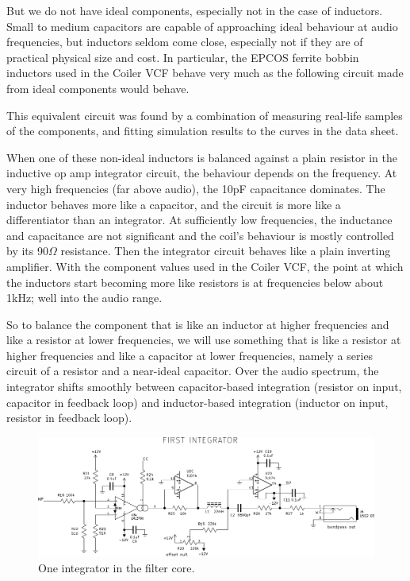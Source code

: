 But we do not have ideal components, especially not in the case of
inductors.  Small to medium capacitors are capable of approaching ideal
behaviour at audio frequencies, but inductors seldom come close, especially
not if they are of practical physical size and cost.  In particular, the
EPCOS ferrite bobbin inductors used in the Coiler VCF behave very much as
the following circuit made from ideal components would behave.

\vspace{0.5\baselineskip}
{\centering\par}

This equivalent circuit was found by a combination of measuring
real-life samples of the components, and fitting simulation results to the
curves in the data sheet.

When one of these non-ideal inductors is balanced against a plain resistor
in the inductive op amp integrator circuit, the behaviour depends on the
frequency.  At very high frequencies (far above audio), the 10pF capacitance
dominates.  The inductor behaves more like a capacitor, and the circuit is
more like a differentiator than an integrator.  At sufficiently low
frequencies, the inductance and capacitance are not significant and the
coil's behaviour is mostly controlled by its 90$\Omega$ resistance.  Then
the integrator circuit behaves like a plain inverting amplifier.  With the
component values used in the Coiler VCF, the point at which the inductors
start becoming more like resistors is at frequencies below about 1kHz; well
into the audio range.

So to balance the component that is like an inductor at higher frequencies
and like a resistor at lower frequencies, we will use something that is like
a resistor at higher frequencies and like a capacitor at lower frequencies,
namely a series circuit of a resistor and a near-ideal capacitor.  Over the
audio spectrum, the integrator shifts smoothly between capacitor-based
integration (resistor on input, capacitor in feedback loop) and
inductor-based integration (inductor on input, resistor in feedback loop).

\begin{figure}
\centering\includegraphics[width=\linewidth]{integrator.pdf}\par
\caption{One integrator in the filter core.}\label{fig:integrator}
\end{figure}

